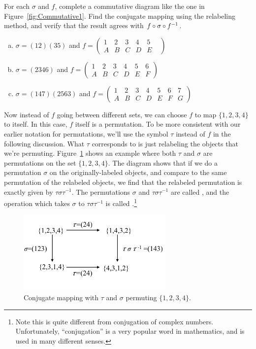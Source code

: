 \begin{exercise}\label{exercise:actions:Conj1}
For each $\sigma$ and $f$, complete a commutative diagram like the one in Figure~\ref{fig:Commutative1}. Find the conjugate mapping using the relabeling method, and verify that the result agrees with $f \circ \sigma \circ f^{-1}$.
\begin{enumerate}[(a)]
\item $\sigma=(12)(35)$ and $f=\begin{pmatrix} 1&2&3&4&5\\ A&B&C&D&E& \end{pmatrix} $
\item $\sigma=(2346)$ and $f=\begin{pmatrix} 1&2&3&4&5&6\\ A&B&C&D&E&F \end{pmatrix}$
\item $\sigma=(147)(2563)$ and $f=\begin{pmatrix} 1&2&3&4&5&6&7\\ A&B&C&D&E&F&G \end{pmatrix}$
\end{enumerate}
\end{exercise}
Now instead of $f$ going between different sets, we can choose $f$ to map $\{1,2,3,4\}$ to itself. In this case, $f$ itself is a permutation.  To be more consistent with our earlier notation for permutations, we'll use the symbol $\tau$ instead of $f$ in the following discussion.  What $\tau$ corresponds to is just relabeling the objects that we're permuting. Figure~\ref{fig:Commutative2} shows an example where both $\tau$ and $\sigma$ are permutations on the set $\{1,2,3,4\}$. The diagram shows that if we do a permutation $\sigma$ on the originally-labeled objects, and compare to the same permutation of the relabeled objects, we find that the relabeled permutation is exactly given by $\tau\sigma \tau^{-1}$. The permutations $\sigma$ and $\tau\sigma \tau^{-1}$ are called , and the operation which takes $\sigma$ to $\tau \sigma \tau^{-1}$ is called .\footnote{Note this is quite different from conjugation of complex numbers. Unfortunately, ``conjugation'' is a very popular word in mathematics, and is used in many different senses.}

\begin{figure}[ht]
\begin{center}
\includegraphics[width=3in]{images/Commutative2.png}
\caption{Conjugate mapping with $\tau$ and $\sigma$ permuting $\{1,2,3,4\}$.}\label{fig:Commutative2}
\end{center}
\end{figure}

